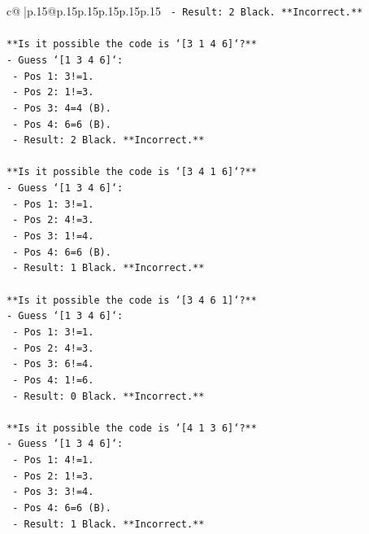\documentclass{article}
\begin{document}
{\begin{supertabular}{c@{$\;$}|p{.15\linewidth}@{}p{.15\linewidth}p{.15\linewidth}p{.15\linewidth}p{.15\linewidth}p{.15\linewidth}}
{{{\texttt{    {-}   Result: 2 Black. **Incorrect.**} \\
\\ 
\texttt{**Is it possible the code is `{[}3 1 4 6{]}`?**} \\
\texttt{{-}   Guess `{[}1 3 4 6{]}`:} \\
\texttt{    {-}   Pos 1: 3!=1.} \\
\texttt{    {-}   Pos 2: 1!=3.} \\
\texttt{    {-}   Pos 3: 4=4 (B).} \\
\texttt{    {-}   Pos 4: 6=6 (B).} \\
\texttt{    {-}   Result: 2 Black. **Incorrect.**} \\
\\ 
\texttt{**Is it possible the code is `{[}3 4 1 6{]}`?**} \\
\texttt{{-}   Guess `{[}1 3 4 6{]}`:} \\
\texttt{    {-}   Pos 1: 3!=1.} \\
\texttt{    {-}   Pos 2: 4!=3.} \\
\texttt{    {-}   Pos 3: 1!=4.} \\
\texttt{    {-}   Pos 4: 6=6 (B).} \\
\texttt{    {-}   Result: 1 Black. **Incorrect.**} \\
\\ 
\texttt{**Is it possible the code is `{[}3 4 6 1{]}`?**} \\
\texttt{{-}   Guess `{[}1 3 4 6{]}`:} \\
\texttt{    {-}   Pos 1: 3!=1.} \\
\texttt{    {-}   Pos 2: 4!=3.} \\
\texttt{    {-}   Pos 3: 6!=4.} \\
\texttt{    {-}   Pos 4: 1!=6.} \\
\texttt{    {-}   Result: 0 Black. **Incorrect.**} \\
\\ 
\texttt{**Is it possible the code is `{[}4 1 3 6{]}`?**} \\
\texttt{{-}   Guess `{[}1 3 4 6{]}`:} \\
\texttt{    {-}   Pos 1: 4!=1.} \\
\texttt{    {-}   Pos 2: 1!=3.} \\
\texttt{    {-}   Pos 3: 3!=4.} \\
\texttt{    {-}   Pos 4: 6=6 (B).} \\
\texttt{    {-}   Result: 1 Black. **Incorrect.**} \\
\\ 
}}}
\end{supertabular}}
\end{document}
